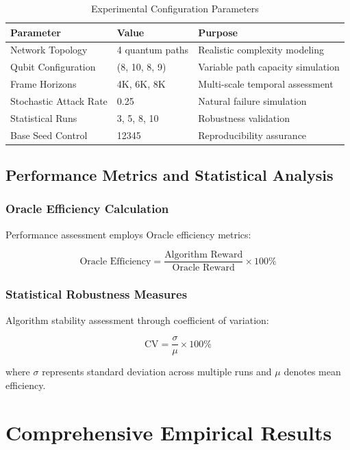 \documentclass[12pt,a4paper]{article}
\begin{document}
\begin{table}[H]
\centering
\caption{Experimental Configuration Parameters}
\begin{tabular}{|l|l|l|}
\hline
\textbf{Parameter} & \textbf{Value} & \textbf{Purpose} \\
\hline
\hline
Network Topology & 4 quantum paths & Realistic complexity modeling \\
Qubit Configuration & (8, 10, 8, 9) & Variable path capacity simulation \\
Frame Horizons & 4K, 6K, 8K & Multi-scale temporal assessment \\
Stochastic Attack Rate & 0.25 & Natural failure simulation \\
Statistical Runs & 3, 5, 8, 10 & Robustness validation \\
Base Seed Control & 12345 & Reproducibility assurance \\
\hline
\end{tabular}
\end{table}

\subsection{Performance Metrics and Statistical Analysis}

\subsubsection{Oracle Efficiency Calculation}
Performance assessment employs Oracle efficiency metrics:

\begin{equation}
\text{Oracle Efficiency} = \frac{\text{Algorithm Reward}}{\text{Oracle Reward}} \times 100\%
\end{equation}

\subsubsection{Statistical Robustness Measures}
Algorithm stability assessment through coefficient of variation:

\begin{equation}
\text{CV} = \frac{\sigma}{\mu} \times 100\%
\end{equation}

where $\sigma$ represents standard deviation across multiple runs and $\mu$ denotes mean efficiency.

\section{Comprehensive Empirical Results}
\end{document}
